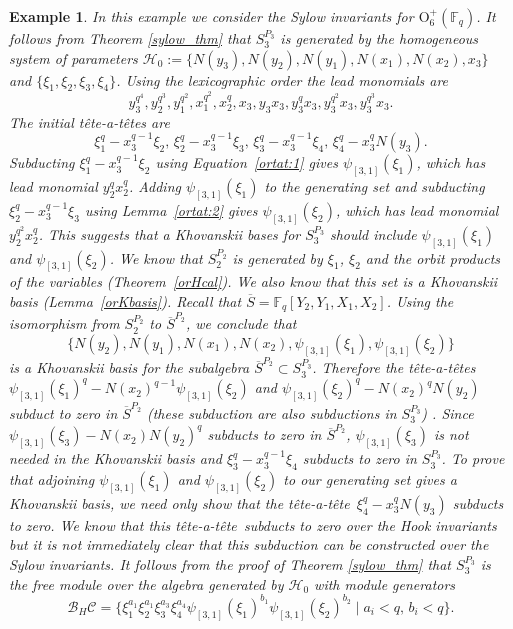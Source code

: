 \documentclass{amsart}
\newcommand{\field}{\mathbb{F}}
\newcommand{\orthp}[2]{{{\text{O}^{+}_{{#1}}(\field_{#2})}}}
\newcommand{\HH}{\mathcal{H}}
\newcommand{\BH}{\mathcal{B}_H}
\newcommand{\tat}{t\^ete-a-t\^ete}
\newtheorem{example}[subsection]{Example}
\begin{document}
\begin{example} In this example we consider the Sylow invariants for $\orthp{6}{q}$. It follows from Theorem \ref{sylow_thm} that $S_3^{P_3}$ is generated by
the homogeneous system of parameters $\HH_0:=\{N(y_3), N(y_2),N(y_1), N(x_1), N(x_2),x_3\}$ and $\{\xi_1,\xi_2,\xi_3,\xi_4\}$.
Using the lexicographic order the lead monomials are $$y_3^{q^4},y_2^{q^3},y_1^{q^2}, x_1^{q^2}, x_2^q, x_3, y_3x_3,y_3^qx_3, y_3^{q^2}x_3, y_3^{q^3}x_3.$$
The initial \tat s are $$\xi_1^q-x_3^{q-1}\xi_2, \, \xi_2^q-x_3^{q-1}\xi_3, \,\xi_3^q-x_3^{q-1}\xi_4, \,\xi_4^q-x_3^qN(y_3).$$
Subducting $\xi_1^q-x_3^{q-1}\xi_2$ using Equation~\ref{ortat:1}
gives $\psi_{[3,1]}(\xi_1)$, which has lead monomial $y_2^qx_2^q$. 
Adding $\psi_{[3,1]}(\xi_1)$ to the generating set and
subducting $\xi_2^q-x_3^{q-1}\xi_3$ using Lemma~\ref{ortat:2} gives $\psi_{[3,1]}(\xi_2)$, which has lead monomial $y_2^{q^2}x_2^q$. 
This suggests that a Khovanskii bases for $S_3^{P_3}$ should include $\psi_{[3,1]}(\xi_1)$ and $\psi_{[3,1]}(\xi_2)$.
We know that $S_2^{P_2}$ is generated by $\xi_1$, $\xi_2$ and the orbit products of the variables (Theorem~\ref{orHcal}).
We also know that this set is a Khovanskii basis (Lemma~\ref{orKbasis}). 
Recall that $\overline{S} = \field_q[Y_2,Y_1,X_1,X_2]$.
Using the isomorphism from $S_2^{P_2}$ to $\overline{S}^{P_2}$, we conclude that  
$$\{N(y_2), N(y_1), N(x_1), N(x_2), \psi_{[3,1]}(\xi_1),\psi_{[3,1]}(\xi_2)\}$$ is a Khovanskii basis for the subalgebra $\overline{S}^{P_2}\subset S_3^{P_3}$.
Therefore the \tat s $\psi_{[3,1]}(\xi_1)^q-N(x_2)^{q-1}\psi_{[3,1]}(\xi_2)$
and $\psi_{[3,1]}(\xi_2)^q-N(x_2)^qN(y_2)$ subduct to zero in $\overline{S}^{P_2}$
(these subduction are also subductions in $S_3^{P_3}$) .
Since $\psi_{[3,1]}(\xi_3)-N(x_2)N(y_2)^q$ subducts to zero in $\overline{S}^{P_2}$,
$\psi_{[3,1]}(\xi_3)$ is not needed in the Khovanskii basis and
$\xi_3^q-x_3^{q-1}\xi_4$ subducts to zero in $S_3^{P_3}$. 
To prove that adjoining $\psi_{[3,1]}(\xi_1)$ and $\psi_{[3,1]}(\xi_2)$ to our generating set gives a Khovanskii basis, we need only show that the \tat\ 
$\xi_4^q-x_3^qN(y_3)$ subducts to zero. We know that this \tat\ subducts to zero over the Hook invariants but it is not immediately clear that this subduction can be constructed over the Sylow invariants. It follows from the proof of Theorem \ref{sylow_thm} that $S_3^{P_3}$ is the free module over the algebra generated by $\HH_0$ with module generators
$$\BH\mathcal{C}=\{ \xi_1^{a_1}\xi_2^{a_1}\xi_3^{a_3}\xi_4^{a_4}\psi_{[3,1]}(\xi_1)^{b_1}\psi_{[3,1]}(\xi_2)^{b_2}\mid a_i<q,\, b_i<q\}.$$

\end{example}
\end{document}
